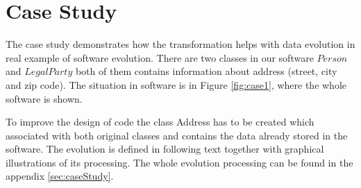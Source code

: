 \documentclass[11pt]{article}
\begin{document}
 
\section{Case Study}
The case study demonstrates how the transformation helps with data evolution in real example of software evolution. There are two classes in our software $Person$ and $LegalParty$ both of them contains information about address (street, city and zip code). The situation in software is in Figure \ref{fig:case1}, where the whole software is shown. 

To improve the design of code the class Address has to be created which associated with both original classes and contains the data already stored in the software. The evolution is defined in following text together with graphical illustrations of its processing. The whole evolution processing can be found in the appendix \ref{sec:caseStudy}.
\end{document}
